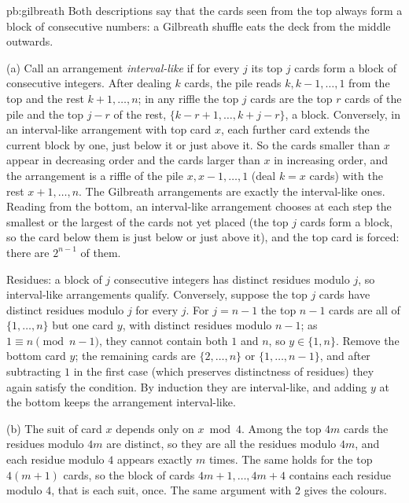 \begin{solution}{pb:gilbreath}
\idea Both descriptions say that the cards seen from the top always form a block of consecutive numbers: a Gilbreath shuffle eats the
deck from the middle outwards.

\writeup (a) Call an arrangement \emph{interval-like} if for every $j$ its top $j$ cards form a block of consecutive integers. After dealing $k$ cards, the
pile reads $k,k-1,\dots,1$ from the top and the rest $k+1,\dots,n$; in any riffle the top $j$ cards are the top $r$ cards of the pile and the top $j-r$
of the rest, $\{k-r+1,\dots,k+j-r\}$, a block. Conversely, in an interval-like arrangement with top card $x$, each further card extends the current
block by one, just below it or just above it. So the cards smaller than $x$ appear in decreasing order and the cards larger than $x$ in increasing
order, and the arrangement is a riffle of the pile $x,x-1,\dots,1$ (deal $k=x$ cards) with the rest $x+1,\dots,n$. The Gilbreath arrangements are exactly the
interval-like ones. Reading from the bottom, an interval-like arrangement chooses at each step the smallest or the largest of the cards not yet
placed (the top $j$ cards form a block, so the card below them is just below or just above it), and the top card is forced: there are $2^{n-1}$ of
them.

Residues: a block of $j$ consecutive integers has distinct residues modulo $j$, so interval-like arrangements qualify. Conversely, suppose the top $j$ cards
have distinct residues modulo $j$ for every $j$. For $j=n-1$ the top $n-1$ cards are all of $\{1,\dots,n\}$ but one card $y$, with distinct residues modulo
$n-1$; as $1\equiv n\pmod{n-1}$, they cannot contain both $1$ and $n$, so $y\in\{1,n\}$. Remove the bottom card $y$; the remaining cards are $\{2,\dots,n\}$ or $\{1,\dots,n-1\}$,
and after subtracting $1$ in the first case (which preserves distinctness of residues) they again satisfy the condition. By induction they
are interval-like, and adding $y$ at the bottom keeps the arrangement interval-like.

(b) The suit of card $x$ depends only on $x\bmod4$. Among the top $4m$ cards the residues modulo $4m$ are distinct, so they are all the residues
modulo $4m$, and each residue modulo $4$ appears exactly $m$ times. The same holds for the top $4(m+1)$ cards, so the block of cards $4m+1,\dots,4m+4$
contains each residue modulo $4$, that is each suit, once. The same argument with $2$ gives the colours.


\end{solution}
